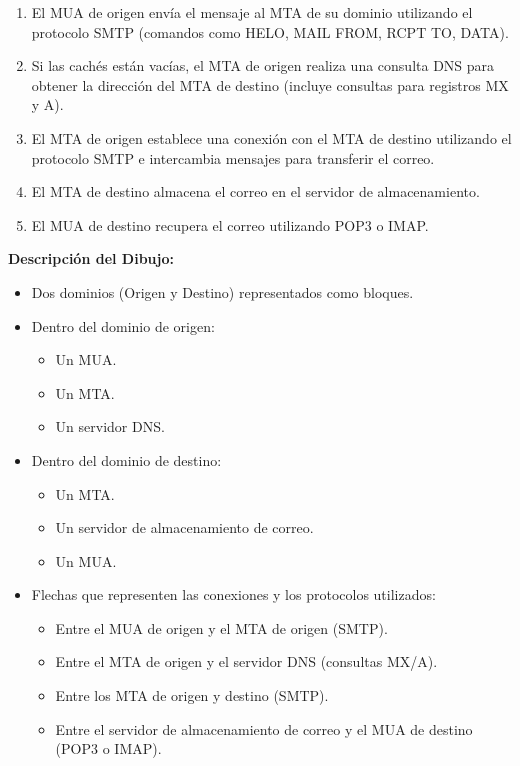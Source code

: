\documentclass[12pt]{article}
\begin{document}
\begin{enumerate}
    \item El MUA de origen envía el mensaje al MTA de su dominio utilizando el protocolo SMTP (comandos como HELO, MAIL FROM, RCPT TO, DATA).
    \item Si las cachés están vacías, el MTA de origen realiza una consulta DNS para obtener la dirección del MTA de destino (incluye consultas para registros MX y A).
    \item El MTA de origen establece una conexión con el MTA de destino utilizando el protocolo SMTP e intercambia mensajes para transferir el correo.
    \item El MTA de destino almacena el correo en el servidor de almacenamiento.
    \item El MUA de destino recupera el correo utilizando POP3 o IMAP.
\end{enumerate}

\textbf{Descripción del Dibujo:}
\begin{itemize}
    \item Dos dominios (Origen y Destino) representados como bloques.
    \item Dentro del dominio de origen:
    \begin{itemize}
        \item Un MUA.
        \item Un MTA.
        \item Un servidor DNS.
    \end{itemize}
    \item Dentro del dominio de destino:
    \begin{itemize}
        \item Un MTA.
        \item Un servidor de almacenamiento de correo.
        \item Un MUA.
    \end{itemize}
    \item Flechas que representen las conexiones y los protocolos utilizados:
    \begin{itemize}
        \item Entre el MUA de origen y el MTA de origen (SMTP).
        \item Entre el MTA de origen y el servidor DNS (consultas MX/A).
        \item Entre los MTA de origen y destino (SMTP).
        \item Entre el servidor de almacenamiento de correo y el MUA de destino (POP3 o IMAP).
    \end{itemize}
\end{itemize}
\end{document}
